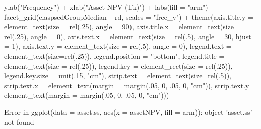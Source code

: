 \begin{Schunk}
\begin{Sinput}
	ylab("Frequency") + xlab("Asset NPV (Tk)") + labs(fill = "arm") +
	facet_grid(elaspsedGroupMedian ~ rd, scales = "free_y") + 
	theme(axis.title.y = element_text(size = rel(.25), angle = 90), 
		axis.title.x = element_text(size = rel(.25), angle = 0),
		axis.text.x = element_text(size = rel(.5), angle = 30, hjust = 1),
		axis.text.y = element_text(size = rel(.5), angle = 0),
		legend.text = element_text(size=rel(.25)), 
		legend.position = "bottom", 
		legend.title = element_text(size = rel(.25)),
		legend.key = element_rect(size = rel(.25)),
		legend.key.size = unit(.15, "cm"),
		strip.text = element_text(size=rel(.5)),
		strip.text.x = element_text(margin = margin(.05, 0, .05, 0, "cm")),
		strip.text.y = element_text(margin = margin(.05, 0, .05, 0, "cm")))
\end{Sinput}
\begin{Soutput}
Error in ggplot(data = asset.ss, aes(x = assetNPV, fill = arm)): object 'asset.ss' not found
\end{Soutput}
\end{Schunk}

